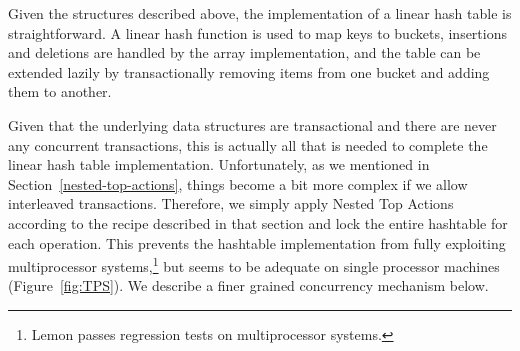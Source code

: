 \documentclass[letterpaper,twocolumn,english]{article}
\newcommand{\yad}{Lemon\xspace}
\begin{document}
Given the structures described above, the implementation of a linear hash
table is straightforward.  A linear hash function is used to map keys
to buckets, insertions and deletions are handled by the array implementation,
and the table can be extended lazily by transactionally removing items
from one bucket and adding them to another.

Given that the underlying data structures are transactional and there
are never any concurrent transactions, this is actually all that is
needed to complete the linear hash table implementation.
Unfortunately, as we mentioned in Section~\ref{nested-top-actions},
things become a bit more complex if we allow interleaved transactions.
Therefore, we simply apply Nested Top Actions according to the recipe
described in that section and lock the entire hashtable for each
operation.  This prevents the hashtable implementation from fully
exploiting multiprocessor systems,\footnote{\yad passes regression 
tests on multiprocessor systems.}  but seems to be adequate on single 
processor machines (Figure~\ref{fig:TPS}).
We describe a finer grained concurrency mechanism below.

%
\end{document}
